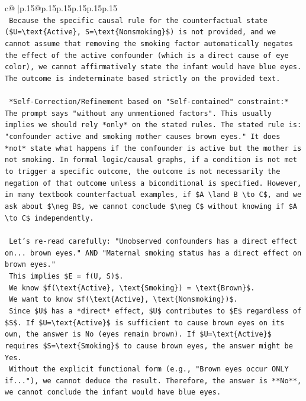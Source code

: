 \documentclass{article}
\begin{document}
{\begin{supertabular}{c@{$\;$}|p{.15\linewidth}@{}p{.15\linewidth}p{.15\linewidth}p{.15\linewidth}p{.15\linewidth}p{.15\linewidth}}
{{{\\ 
\texttt{    Because the specific causal rule for the counterfactual state (\$U=\textbackslash{}text\{Active\}, S=\textbackslash{}text\{Nonsmoking\}\$) is not provided, and we cannot assume that removing the smoking factor automatically negates the effect of the active confounder (which is a direct cause of eye color), we cannot affirmatively state the infant would have blue eyes. The outcome is indeterminate based strictly on the provided text.} \\
\\ 
\texttt{    *Self{-}Correction/Refinement based on "Self{-}contained" constraint:* The prompt says "without any unmentioned factors". This usually implies we should rely *only* on the stated rules. The stated rule is: "confounder active and smoking mother causes brown eyes." It does *not* state what happens if the confounder is active but the mother is not smoking. In formal logic/causal graphs, if a condition is not met to trigger a specific outcome, the outcome is not necessarily the negation of that outcome unless a biconditional is specified. However, in many textbook counterfactual examples, if \$A \textbackslash{}land B \textbackslash{}to C\$, and we ask about \$\textbackslash{}neg B\$, we cannot conclude \$\textbackslash{}neg C\$ without knowing if \$A \textbackslash{}to C\$ independently.} \\
\\ 
\texttt{    Let's re{-}read carefully: "Unobserved confounders has a direct effect on... brown eyes." AND "Maternal smoking status has a direct effect on brown eyes."} \\
\texttt{    This implies \$E = f(U, S)\$.} \\
\texttt{    We know \$f(\textbackslash{}text\{Active\}, \textbackslash{}text\{Smoking\}) = \textbackslash{}text\{Brown\}\$.} \\
\texttt{    We want to know \$f(\textbackslash{}text\{Active\}, \textbackslash{}text\{Nonsmoking\})\$.} \\
\texttt{    Since \$U\$ has a *direct* effect, \$U\$ contributes to \$E\$ regardless of \$S\$. If \$U=\textbackslash{}text\{Active\}\$ is sufficient to cause brown eyes on its own, the answer is No (eyes remain brown). If \$U=\textbackslash{}text\{Active\}\$ requires \$S=\textbackslash{}text\{Smoking\}\$ to cause brown eyes, the answer might be Yes.} \\
\texttt{    Without the explicit functional form (e.g., "Brown eyes occur ONLY if..."), we cannot deduce the result. Therefore, the answer is **No**, we cannot conclude the infant would have blue eyes.} \\
}}}
\end{supertabular}}
\end{document}
